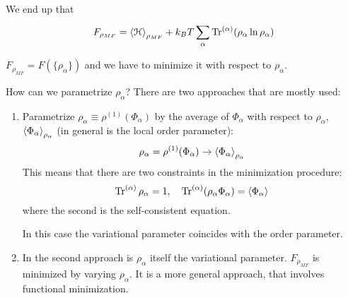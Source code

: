 \documentclass[../main/main.tex]{subfiles}
\begin{document}
We end up that
\begin{equation}
  F_{\rho _{MF}} = \expval{\mathcal{H}}_{\rho _{MF}} + k_B T \sum_{\alpha }^{} \Tr^{(\alpha )}(\rho _ \alpha  \ln{\rho _ \alpha } )
\end{equation}
\begin{remark}
\( F_{\rho _{MF}} = F ( \{ \rho _ \alpha  \}  ) \)  and we have to minimize it with respect to \( \rho _ \alpha  \).
\end{remark}
How can we parametrize \( \rho _ \alpha  \)?
There are two approaches that are mostly used:
\begin{enumerate}
\item Parametrize \( \rho _ \alpha \equiv \rho ^{(1)} (\Phi _ \alpha )\) by the average of \( \Phi _ \alpha  \) with respect to \( \rho _ \alpha  \), \( \expval{\Phi _ \alpha }_ { \rho _ \alpha }  \) (in general is the local order parameter):
\begin{equation*}
  \rho _ \alpha = \rho ^{(1)} ( \Phi _{\alpha })  \rightarrow  \expval{\Phi _ \alpha }_ {\rho _ \alpha }
\end{equation*}
This means that there are two constraints in the minimization procedure:
\begin{equation*}
  \Tr^{(\alpha )} \rho _ \alpha = 1, \quad  \Tr^{(\alpha )}(\rho _ \alpha \Phi _ \alpha ) = \expval{\Phi _ \alpha }
\end{equation*}
where the second is the self-consistent equation.
\begin{remark}
In this case the variational parameter coincides with the order parameter.
\end{remark}

\item In the second approach is \( \rho _ \alpha  \) itself the variational parameter.
\( F_{\rho _{MF}} \) is minimized by varying \( \rho _ \alpha  \). It is a more general approach, that involves functional minimization.
\end{enumerate}
\end{document}
